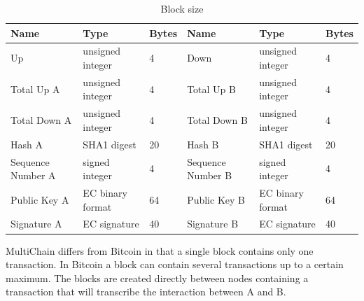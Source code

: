 \begin{table}[]
\centering
\begin{tabular}{l|lll|ll}
Name              & Type             & Bytes                   & Name              & Type             & Bytes \\ \hline
Up                & unsigned integer & \multicolumn{1}{l|}{4}  & Down              & unsigned integer & 4     \\
Total Up A        & unsigned integer & \multicolumn{1}{l|}{4}  & Total Up B        & unsigned integer & 4     \\
Total Down A      & unsigned integer & \multicolumn{1}{l|}{4}  & Total Down B      & unsigned integer & 4     \\
Hash A            & SHA1 digest      & \multicolumn{1}{l|}{20} & Hash B            & SHA1 digest      & 20    \\
Sequence Number A & signed integer   & \multicolumn{1}{l|}{4}  & Sequence Number B & signed integer   & 4     \\
Public Key A      & EC binary format & \multicolumn{1}{l|}{64} & Public Key B      & EC binary format & 64    \\
Signature A       & EC signature     & \multicolumn{1}{l|}{40} & Signature B       & EC signature     & 40
\end{tabular}
\caption{Block size}
\label{table:block_size}
\end{table}

MultiChain differs from Bitcoin in that a single block contains only one transaction.
In Bitcoin a block can contain several transactions up to a certain maximum.
The blocks are created directly between nodes containing a transaction
that will transcribe the interaction between A and B.